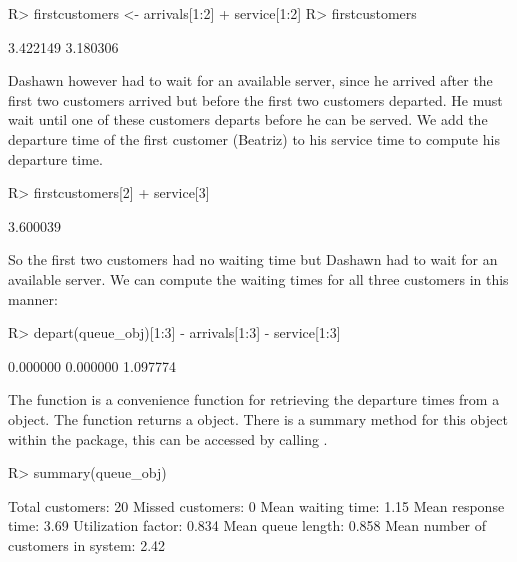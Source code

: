 \documentclass[article]{jss}
\begin{document}
\begin{CodeChunk}
\begin{CodeInput}
R> firstcustomers <- arrivals[1:2] + service[1:2]
R> firstcustomers
 \end{CodeInput}
 \begin{CodeOutput}
[1] 3.422149 3.180306
 \end{CodeOutput}
\end{CodeChunk}

Dashawn however had to wait for an available server, since he arrived after the first two customers arrived but before the first two customers departed. He must wait until one of these customers departs before he can be served. We add the departure time of the first customer (Beatriz) to his service time to compute his departure time.

\begin{CodeChunk}
\begin{CodeInput}
R> firstcustomers[2] + service[3]
\end{CodeInput}
\begin{CodeOutput}
[1] 3.600039
\end{CodeOutput}
\end{CodeChunk}

So the first two customers had no waiting time but Dashawn had to wait for an available server. We can compute the waiting times for all three customers in this manner:

\begin{CodeChunk}
\begin{CodeInput}
R> depart(queue_obj)[1:3] - arrivals[1:3] - service[1:3]
\end{CodeInput}
\begin{CodeOutput}
[1] 0.000000 0.000000 1.097774
\end{CodeOutput}
\end{CodeChunk}

The  function is a convenience function for retrieving the departure times from a  object. The  function returns a  object. There is a summary method for this object within the  package, this can be accessed by calling . 

\begin{CodeChunk}
\begin{CodeInput}
R> summary(queue_obj)
\end{CodeInput}
\begin{CodeOutput}
Total customers:
 20
Missed customers:
 0
Mean waiting time:
 1.15
Mean response time:
 3.69
Utilization factor:
 0.834
Mean queue length:
 0.858
Mean number of customers in system:
 2.42
\end{CodeOutput}
\end{CodeChunk}
\end{document}
